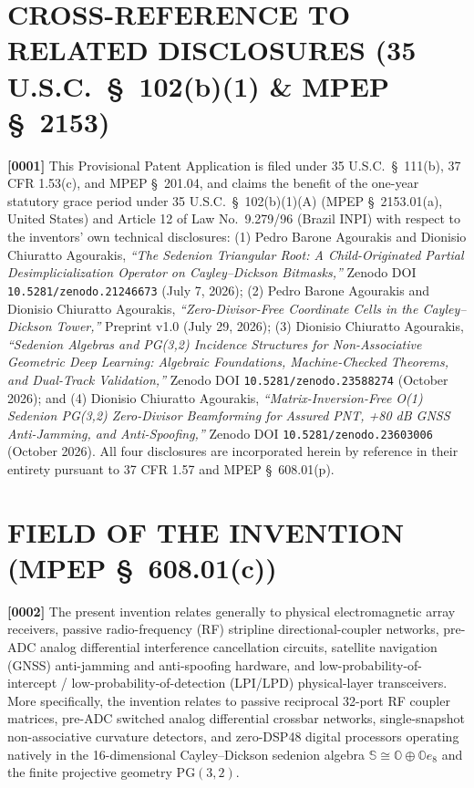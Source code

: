 \documentclass[12pt,letterpaper]{article}
\begin{document}
\section*{CROSS-REFERENCE TO RELATED DISCLOSURES (35 U.S.C.\ \S\ 102(b)(1) \& MPEP \S\ 2153)}
\textbf{[0001]} This Provisional Patent Application is filed under 35 U.S.C.\ \S\ 111(b), 37 CFR 1.53(c), and MPEP \S\ 201.04, and claims the benefit of the one-year statutory grace period under 35 U.S.C.\ \S\ 102(b)(1)(A) (MPEP \S\ 2153.01(a), United States) and Article 12 of Law No.\ 9.279/96 (Brazil INPI) with respect to the inventors' own technical disclosures: (1) Pedro Barone Agourakis and Dionisio Chiuratto Agourakis, \textit{``The Sedenion Triangular Root: A Child-Originated Partial Desimplicialization Operator on Cayley--Dickson Bitmasks,''} Zenodo DOI \texttt{10.5281/zenodo.21246673} (July 7, 2026); (2) Pedro Barone Agourakis and Dionisio Chiuratto Agourakis, \textit{``Zero-Divisor-Free Coordinate Cells in the Cayley--Dickson Tower,''} Preprint v1.0 (July 29, 2026); (3) Dionisio Chiuratto Agourakis, \textit{``Sedenion Algebras and PG(3,2) Incidence Structures for Non-Associative Geometric Deep Learning: Algebraic Foundations, Machine-Checked Theorems, and Dual-Track Validation,''} Zenodo DOI \texttt{10.5281/zenodo.23588274} (October 2026); and (4) Dionisio Chiuratto Agourakis, \textit{``Matrix-Inversion-Free O(1) Sedenion PG(3,2) Zero-Divisor Beamforming for Assured PNT, +80 dB GNSS Anti-Jamming, and Anti-Spoofing,''} Zenodo DOI \texttt{10.5281/zenodo.23603006} (October 2026). All four disclosures are incorporated herein by reference in their entirety pursuant to 37 CFR 1.57 and MPEP \S\ 608.01(p).

\section*{FIELD OF THE INVENTION (MPEP \S\ 608.01(c))}
\textbf{[0002]} The present invention relates generally to physical electromagnetic array receivers, passive radio-frequency (RF) stripline directional-coupler networks, pre-ADC analog differential interference cancellation circuits, satellite navigation (GNSS) anti-jamming and anti-spoofing hardware, and low-probability-of-intercept / low-probability-of-detection (LPI/LPD) physical-layer transceivers. More specifically, the invention relates to passive reciprocal 32-port RF coupler matrices, pre-ADC switched analog differential crossbar networks, single-snapshot non-associative curvature detectors, and zero-DSP48 digital processors operating natively in the 16-dimensional Cayley--Dickson sedenion algebra $\mathbb{S} \cong \mathbb{O} \oplus \mathbb{O}e_8$ and the finite projective geometry $\mathrm{PG}(3,2)$.
\end{document}
